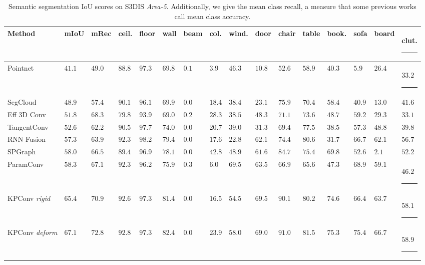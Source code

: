 \documentclass[10pt,twocolumn,letterpaper]{article}
\newcommand\Tstrut{\rule{-3pt}{2.6ex}}       %
\newcommand\Bstrut{\rule[-0.9ex]{-3pt}{0pt}} %
\begin{document}
\begin{table}[b]
\setlength\tabcolsep{0.5pt}
\begin{small}
\begin{center}
\begin{tabular}{L{2.4cm} | C{1.0cm} | C{1.0cm} | *{13}{C{0.9cm}}}
Method	 & mIoU & mRec & ceil.	 & floor	 & wall	 & beam	 & col.	 & wind.	 & door	 & chair	 & table	 & book.	 & sofa	 & board & clut.	\Bstrut\\
\hline
Pointnet \cite{qi2017pointnet}	& $41.1$	& $49.0$	& $88.8$	& $97.3$	& $69.8$	& $0.1$	& $3.9$	& $46.3$	& $10.8$	& $52.6$	& $58.9$	& $40.3$	& $5.9$	& $26.4$	& $33.2$	\Tstrut\\
SegCloud \cite{tchapmi2017segcloud}	& $48.9$	& $57.4$	& $90.1$	& $96.1$	& $69.9$	& $0.0$	& $18.4$	& $38.4$	& $23.1$	& $75.9$	& $70.4$	& $58.4$	& $40.9$	& $13.0$	& $41.6$	\\
Eff 3D Conv \cite{zhang2018efficient}	& $51.8$	& $68.3$	& $79.8$	& $93.9$	& $69.0$	& $0.2$	& $28.3$	& $38.5$	& $48.3$	& $71.1$	& $73.6$	& $48.7$	& $59.2$	& $29.3$	& $33.1$	\\
TangentConv \cite{tatarchenko2018tangent}	& $52.6$	& $62.2$	& $90.5$	& $97.7$	& $74.0$	& $0.0$	& $20.7$	& $39.0$	& $31.3$	& $69.4$	& $77.5$	& $38.5$	& $57.3$	& $48.8$	& $39.8$	\\
RNN Fusion \cite{ye20183d}	& $57.3$	& $63.9$	& $92.3$	& $\mathbf{98.2}$	& $79.4$	& $0.0$	& $17.6$	& $22.8$	& $62.1$	& $74.4$	& $80.6$	& $31.7$	& $66.7$	& $62.1$	& $56.7$	\\
SPGraph \cite{landrieu2018large}	& $58.0$	& $66.5$	& $89.4$	& $96.9$	& $78.1$	& $0.0$	& $\mathbf{42.8}$	& $48.9$	& $61.6$	& $84.7$	& $75.4$	& $69.8$	& $52.6$	& $2.1$	& $52.2$	\\
ParamConv \cite{wang2018deep}	& $58.3$	& $67.1$	& $92.3$	& $96.2$	& $75.9$	& $\mathbf{0.3}$	& $6.0$	& $\mathbf{69.5}$	& $63.5$	& $66.9$	& $65.6$	& $47.3$	& $68.9$	& $59.1$	& $46.2$	\Bstrut\\
\hline
KPConv \textit{rigid}	& $65.4$	& $70.9$	& $92.6$	& $97.3$	& $81.4$	& $0.0$	& $16.5$	& $54.5$	& $\mathbf{69.5}$	& $90.1$	& $80.2$	& $74.6$	& $66.4$	& $63.7$	& $58.1$	\Tstrut\\
KPConv \textit{deform}	& $\mathbf{67.1}$	& $\mathbf{72.8}$	& $\mathbf{92.8}$	& $97.3$	& $\mathbf{82.4}$	& $0.0$	& $23.9$	& $58.0$	& $69.0$	& $\mathbf{91.0}$	& $\mathbf{81.5}$	& $\mathbf{75.3}$	& $\mathbf{75.4}$	& $\mathbf{66.7}$	& $\mathbf{58.9}$	\Bstrut\\
\hline
\end{tabular}
\end{center}
\end{small}
\caption{Semantic segmentation IoU scores on S3DIS \textit{Area-5}. Additionally, we give the mean class recall, a measure that some previous works call mean class accuracy.}
\label{Table_S3DIS_area5} 
\end{table}
\end{document}
